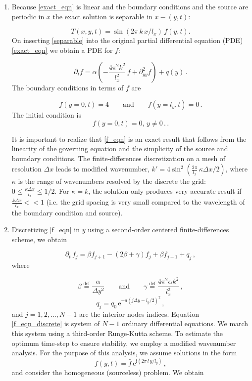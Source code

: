 \documentclass[11pt]{article}
\newcommand{\defn}{\stackrel{\text{def}}{=}}
\newcommand{\ii}{\mathrm{i}}
\newcommand{\ee}{\mathrm{e}}
\newcommand{\com}{\, ,}
\newcommand{\per}{\, .}
\def\beq{\begin{equation}}
\def\eeq{\end{equation}}
\begin{document}
\begin{enumerate}[label=(\alph*)]
    \item Because \eqref{exact_eqn} is linear and the  boundary conditions and the source are periodic in $x$ the exact solution is separable in $x-(y,t)$:

        \beq
        \label{separable}
        T(x,y,t) = \sin\left(2\pi\,k\,x/l_x\right)\,f(y,t).
        \eeq
        On inserting \eqref{separable} into the original partial differential equation (PDE) \eqref{exact_eqn} we obtain a PDE for $f$:

        \beq
        \label{f_eqn}
    \partial_t f = \alpha\left(-\frac{4\pi^2k^2}{l_x^2}\,f + \partial^2_{yy}f\right) + q(y)\per
        \eeq
        The boundary conditions in terms of $f$ are

        \beq
        \label{f_bc}
            f(y=0,t) = 4\qquad \text{and}\qquad f(y=l_y,t) = 0\per
        \eeq
        The initial condition is
        \beq
            f(y=0,t) = 0, \,y\neq0\per\per
        \eeq



        It is important to realize that \eqref{f_eqn} is an exact result that follows from the linearity of the governing equation and the simplicity of the source and boundary conditions. The finite-differences discretization on a mesh of resolution $\Delta x$ leads to modified wavenumber, $k'= 4\sin^2\left(\tfrac{2\pi}{l_x}\,\kappa\Delta x/2\right)$, where $\kappa$ is the range of wavenumbers resolved by the discrete the grid: $0\leq\tfrac{\kappa\Delta x}{l_x}\leq 1/2$. For $\kappa = k$, the solution only produces very accurate result if $\tfrac{k\Delta x}{l_x}<<1$ (i.e. the grid spacing is very small compared to the wavelength of the boundary condition and source).

    \item Discretizing \eqref{f_eqn} in $y$ using a second-order centered finite-differences scheme, we obtain

        \beq
            \label{f_eqn_discrete}
            \partial_t\,f_j = \beta f_{j+1} - \left(2\beta + \gamma\right)f_j + \beta f_{j-1} + q_j\com
        \eeq
        where

        \beq
        \label{beta_gamma_defn}
        \beta \defn \frac{\alpha}{\Delta y^2} \qquad\text{and}\qquad \gamma \defn \frac{4\pi^2\alpha k^2}{l_x^2}\com
        \eeq
        \beq
        q_j = q_0\,\ee^{-a(j\Delta y - l_y/2)^2}\com
        \eeq
        and $j=1,2,\ldots,N-1$ are the interior nodes indices. Equation \eqref{f_eqn_discrete} is system of $N-1$ ordinary differential equations. We march this system using a third-order Runge-Kutta scheme. To estimate the optimum time-step to ensure stability, we employ a modified wavenumber analysis. For the purpose of this analysis, we assume solutions in the form
        \beq
        f(y,t) = \hat{f}\,\ee^{\ii(2\pi\,l\,y/l_y)}\com
        \eeq
        and consider the homogeneous (sourceless) problem. We obtain


\end{enumerate}
\end{document}
